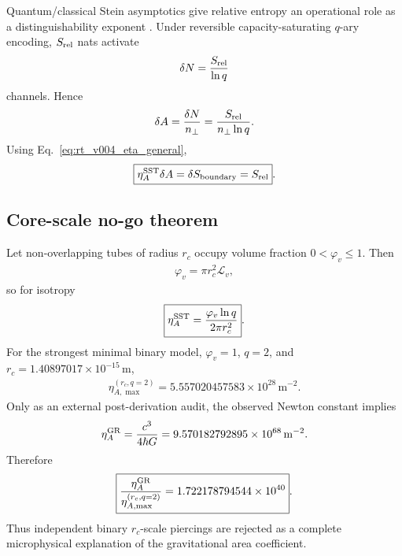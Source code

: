 Quantum/classical Stein asymptotics give relative entropy an operational role
as a distinguishability exponent \cite{HiaiPetz1991}. Under reversible
capacity-saturating $q$-ary encoding, $S_{\rm rel}$ nats activate
\begin{align}
    \delta N
    =
    \frac{S_{\rm rel}}{\ln q}
\end{align}
channels. Hence
\begin{align}
    \delta A
    =
    \frac{\delta N}{n_\perp}
    =
    \frac{S_{\rm rel}}{n_\perp\ln q}.
\end{align}
Using Eq.~\eqref{eq:rt_v004_eta_general},
\begin{align}
    \boxed{
    \eta_A^{\rm SST}\delta A
    =
    \delta S_{\rm boundary}
    =
    S_{\rm rel}
    }.
    \label{eq:rt_v004_encoding_closure}
\end{align}

\subsection{Core-scale no-go theorem}

Let non-overlapping tubes of radius $r_c$ occupy volume fraction
$0<\varphi_v\le1$. Then
\begin{align}
    \varphi_v
    =
    \pi r_c^2\mathcal L_v,
\end{align}
so for isotropy
\begin{align}
    \boxed{
    \eta_A^{\rm SST}
    =
    \frac{\varphi_v\ln q}{2\pi r_c^2}
    }.
    \label{eq:rt_v004_core_eta}
\end{align}
For the strongest minimal binary model,
$\varphi_v=1$, $q=2$, and
$r_c=1.40897017\times10^{-15}\,\mathrm m$,
\begin{align}
    \eta_{A,\max}^{(r_c,q=2)}
    =
    5.557020457583\times10^{28}\,\mathrm{m^{-2}}.
\end{align}
Only as an external post-derivation audit, the observed Newton constant implies
\begin{align}
    \eta_A^{\rm GR}
    =
    \frac{c^3}{4\hbar G}
    =
    9.570182792895\times10^{68}\,\mathrm{m^{-2}}.
\end{align}
Therefore
\begin{align}
    \boxed{
    \frac{\eta_A^{\rm GR}}
    {\eta_{A,\max}^{(r_c,q=2)}}
    =
    1.722178794544\times10^{40}
    }.
    \label{eq:rt_v004_no_go_ratio}
\end{align}
Thus independent binary $r_c$-scale piercings are rejected as a complete
microphysical explanation of the gravitational area coefficient.

